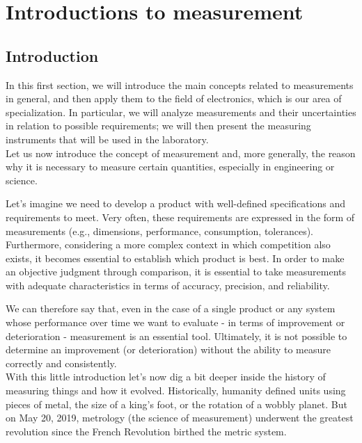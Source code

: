 \documentclass[../main.tex]{subfiles}
\begin{document}

\clearpage
\thispagestyle{empty}
\vspace*{7cm}
\section{Introductions to measurement}
\vspace*{1.5cm}



\subsection{Introduction}

In this first section, we will introduce the main concepts related to measurements in general, and then apply them to the field of electronics, which is our area of specialization. In particular, we will analyze measurements and their uncertainties in relation to possible requirements; we will then present the measuring instruments that will be used in the laboratory.\\

Let us now introduce the concept of measurement and, more generally, the reason why it is necessary to measure certain quantities, especially in engineering or science.

Let's imagine we need to develop a product with well-defined specifications and requirements to meet. Very often, these requirements are expressed in the form of measurements (e.g., dimensions, performance, consumption, tolerances). Furthermore, considering a more complex context in which competition also exists, it becomes essential to establish which product is best. In order to make an objective judgment through comparison, it is essential to take measurements with adequate characteristics in terms of accuracy, precision, and reliability.

We can therefore say that, even in the case of a single product or any system whose performance over time we want to evaluate - in terms of improvement or deterioration - measurement is an essential tool. Ultimately, it is not possible to determine an improvement (or deterioration) without the ability to measure correctly and consistently.\\

With this little introduction let's now dig a bit deeper inside the history of measuring things and how it evolved. Historically, humanity defined units using pieces of metal, the size of a king's foot, or the rotation of a wobbly planet. But on May 20, 2019, metrology (the science of measurement) underwent the greatest revolution since the French Revolution birthed the metric system.
\end{document}
